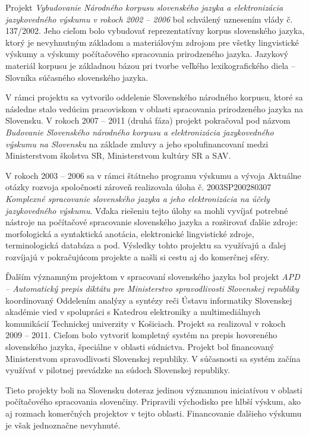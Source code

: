 \begin{multicols}{2}
Projekt {\em Vybudovanie Národného korpusu slovenského jazyka a elektronizácia jazykovedného výskumu v rokoch 2002 – 2006} bol schválený uznesením vlády č. 137/2002. Jeho cieľom bolo vybudovať reprezentatívny korpus slovenského jazyka, ktorý je nevyhnutným základom a materiálovým zdrojom pre všetky lingvistické výskumy a výskumy počítačového spracovania prirodzeného jazyka. Jazykový materiál korpusu je základnou bázou pri tvorbe veľkého lexikografického diela -- Slovníka súčasného slovenského jazyka. 

V rámci projektu sa vytvorilo oddelenie Slovenského národného korpusu, ktoré sa následne stalo vedúcim pracoviskom v oblasti spracovania prirodzeného jazyka na Slovensku. V rokoch 2007 -- 2011 (druhá fáza) projekt pokračoval pod názvom {\em Budovanie Slovenského národného korpusu a elektronizácia jazykovedného výskumu na Slovensku} na základe zmluvy a jeho spolufinancovaní medzi Ministerstvom školstva SR, Ministerstvom kultúry SR a SAV.

V rokoch 2003 -- 2006 sa v rámci štátneho programu výskumu a vývoja Aktuálne otázky rozvoja spoločnosti zároveň realizovala úloha č. 2003SP200280307 {\em Komplexné spracovanie slovenského jazyka a jeho elektronizácia na účely jazykovedného výskumu}. Vďaka riešeniu tejto úlohy sa mohli vyvíjať potrebné nástroje na počítačové spracovanie slovenského jazyka a rozširovať ďalšie zdroje: morfologická a syntaktická anotácia, elektronické lingvistické zdroje, terminologická databáza a pod. Výsledky tohto projektu sa využívajú a ďalej rozvíjajú v pokračujúcom projekte a našli si cestu aj do komerčnej sféry.

Ďalším významným projektom v spracovaní slovenského jazyka bol projekt {\em APD
--  Automatický prepis diktátu pre Ministerstvo spravodlivosti Slovenskej
republiky} koordinovaný Oddelením analýzy a syntézy reči Ústavu informatiky
Slovenskej akadémie vied v spolupráci s Katedrou elektroniky a multimediálnych
komunikácií Technickej univerzity v Košiciach. Projekt sa realizoval v rokoch
2009 -- 2011. Cieľom bolo vytvoriť kompletný systém na prepis hovoreného
slovenského jazyka, špeciálne v oblasti súdnictva. Projekt bol financovaný
Ministerstvom spravodlivosti Slovenskej republiky. V súčasnosti sa systém začína
využívať v pilotnej prevádzke na súdoch Slovenskej republiky.

Tieto projekty boli na Slovensku doteraz jedinou významnou iniciatívou v oblasti počítačového spracovania slovenčiny. Pripravili východisko pre hlbší výskum, ako aj rozmach komerčných projektov v tejto oblasti. Financovanie ďalšieho výskumu je však jednoznačne nevyhnuté. 



\end{multicols}
